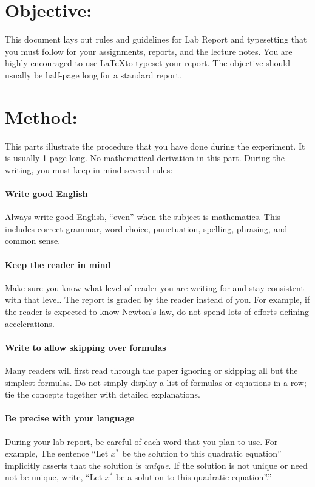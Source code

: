 \tableofcontents
\pagebreak

\rmfamily
\section{Objective:}
This document lays out rules and guidelines for Lab Report and typesetting that you must follow for your assignments, reports, and the lecture notes. You are highly encouraged to use \LaTeX to typeset your report. The objective should usually be half-page long for a standard report.


\section{Method:}
This parts illustrate the procedure that you have done during the experiment. It is usually 1-page long. No mathematical derivation in this part. During the writing, you must keep in mind several rules:

\paragraph{Write good English}
Always write good English, “even” when the subject is mathematics. This includes correct grammar, word choice, punctuation, spelling, phrasing, and common sense.

\paragraph{Keep the reader in mind}
Make sure you know what level of reader you are writing for and stay consistent with that level. The report is graded by the reader instead of you. For example, if the reader is expected to know Newton's law, do not spend lots of efforts defining accelerations.

\paragraph{Write to allow skipping over formulas}
Many readers will first read through the paper ignoring or skipping all but the simplest formulas. Do not simply display a list of formulas or equations in a row; tie the concepts together with detailed explanations.

\paragraph{Be precise with your language}
During your lab report, be careful of each word that you plan to use. For example, The sentence “Let $x^*$ be the solution to this quadratic equation” implicitly asserts that the solution is \emph{unique}. If the solution is not unique or need not be unique, write, “Let $x^*$ be a solution to this quadratic equation”.”

